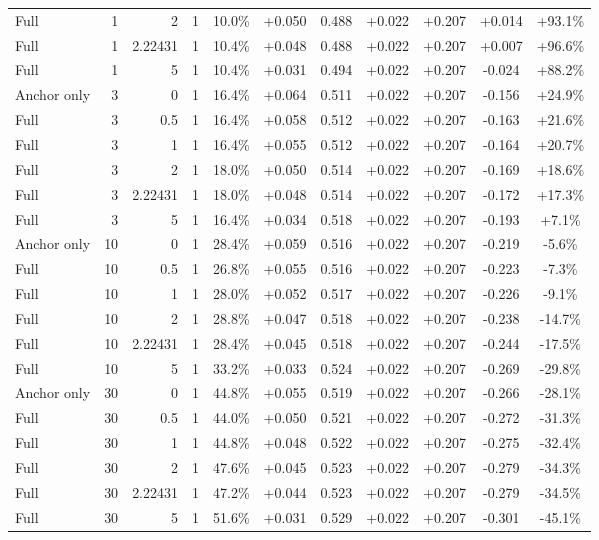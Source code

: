 \begin{table}[htbp]
\begin{tabular}{lrrrccccccc}
Full & 1 & 2 & 1 & 10.0\% & +0.050 & 0.488 & +0.022 & +0.207 & +0.014 & +93.1\% \\
Full & 1 & 2.22431 & 1 & 10.4\% & +0.048 & 0.488 & +0.022 & +0.207 & +0.007 & +96.6\% \\
Full & 1 & 5 & 1 & 10.4\% & +0.031 & 0.494 & +0.022 & +0.207 & -0.024 & +88.2\% \\
Anchor only & 3 & 0 & 1 & 16.4\% & +0.064 & 0.511 & +0.022 & +0.207 & -0.156 & +24.9\% \\
Full & 3 & 0.5 & 1 & 16.4\% & +0.058 & 0.512 & +0.022 & +0.207 & -0.163 & +21.6\% \\
Full & 3 & 1 & 1 & 16.4\% & +0.055 & 0.512 & +0.022 & +0.207 & -0.164 & +20.7\% \\
Full & 3 & 2 & 1 & 18.0\% & +0.050 & 0.514 & +0.022 & +0.207 & -0.169 & +18.6\% \\
Full & 3 & 2.22431 & 1 & 18.0\% & +0.048 & 0.514 & +0.022 & +0.207 & -0.172 & +17.3\% \\
Full & 3 & 5 & 1 & 16.4\% & +0.034 & 0.518 & +0.022 & +0.207 & -0.193 & +7.1\% \\
Anchor only & 10 & 0 & 1 & 28.4\% & +0.059 & 0.516 & +0.022 & +0.207 & -0.219 & -5.6\% \\
Full & 10 & 0.5 & 1 & 26.8\% & +0.055 & 0.516 & +0.022 & +0.207 & -0.223 & -7.3\% \\
Full & 10 & 1 & 1 & 28.0\% & +0.052 & 0.517 & +0.022 & +0.207 & -0.226 & -9.1\% \\
Full & 10 & 2 & 1 & 28.8\% & +0.047 & 0.518 & +0.022 & +0.207 & -0.238 & -14.7\% \\
Full & 10 & 2.22431 & 1 & 28.4\% & +0.045 & 0.518 & +0.022 & +0.207 & -0.244 & -17.5\% \\
Full & 10 & 5 & 1 & 33.2\% & +0.033 & 0.524 & +0.022 & +0.207 & -0.269 & -29.8\% \\
Anchor only & 30 & 0 & 1 & 44.8\% & +0.055 & 0.519 & +0.022 & +0.207 & -0.266 & -28.1\% \\
Full & 30 & 0.5 & 1 & 44.0\% & +0.050 & 0.521 & +0.022 & +0.207 & -0.272 & -31.3\% \\
Full & 30 & 1 & 1 & 44.8\% & +0.048 & 0.522 & +0.022 & +0.207 & -0.275 & -32.4\% \\
Full & 30 & 2 & 1 & 47.6\% & +0.045 & 0.523 & +0.022 & +0.207 & -0.279 & -34.3\% \\
Full & 30 & 2.22431 & 1 & 47.2\% & +0.044 & 0.523 & +0.022 & +0.207 & -0.279 & -34.5\% \\
Full & 30 & 5 & 1 & 51.6\% & +0.031 & 0.529 & +0.022 & +0.207 & -0.301 & -45.1\% \\

\end{tabular}
\end{table}
